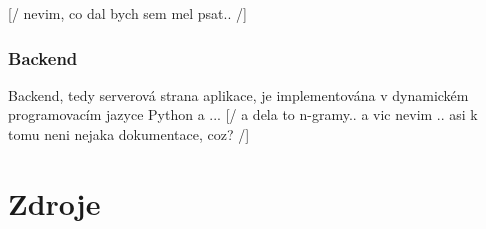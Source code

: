 \documentclass{article}
\begin{document}
[/ nevim, co dal bych sem mel psat.. /]

\subsubsection{Backend}

Backend, tedy serverová strana aplikace, je implementována v dynamickém programovacím jazyce Python a ... [/ a dela to n-gramy.. a vic nevim .. asi k tomu neni nejaka dokumentace, coz? /]


	

\section{Zdroje}



\end{document}
